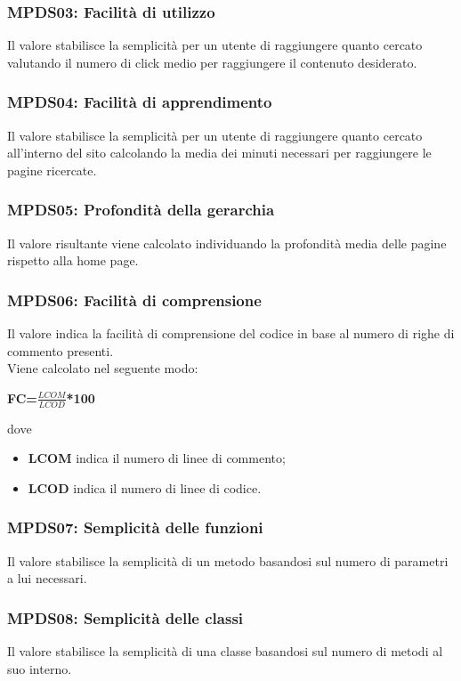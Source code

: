 \subsubsection{MPDS03: Facilità di utilizzo}
Il valore stabilisce la semplicità per un utente di raggiungere quanto cercato valutando il numero di click medio per raggiungere il contenuto desiderato.
\subsubsection{MPDS04: Facilità di apprendimento}
Il valore stabilisce la semplicità per un utente di raggiungere quanto cercato all'interno del sito calcolando la media dei minuti necessari per raggiungere le pagine ricercate.
\subsubsection{MPDS05:  Profondità della gerarchia}
Il valore risultante viene calcolato individuando la profondità media delle pagine rispetto alla home page.
\subsubsection{MPDS06: Facilità di comprensione}
Il valore indica la facilità di comprensione del codice in base al numero di righe di commento presenti.\\
Viene calcolato nel seguente modo:
\begin{center}
	\textbf{FC=\(\frac{LCOM}{LCOD}\)*100}
\end{center}
dove
\begin{itemize}
	\item \textbf{LCOM} indica il numero di linee di commento;
	\item \textbf{LCOD} indica il numero di linee di codice.
\end{itemize}
\subsubsection{MPDS07: Semplicità delle funzioni}
Il valore stabilisce la semplicità di un metodo basandosi sul numero di parametri a lui necessari.
\subsubsection{MPDS08: Semplicità delle classi}
Il valore stabilisce la semplicità di una classe basandosi sul numero di metodi al suo interno.